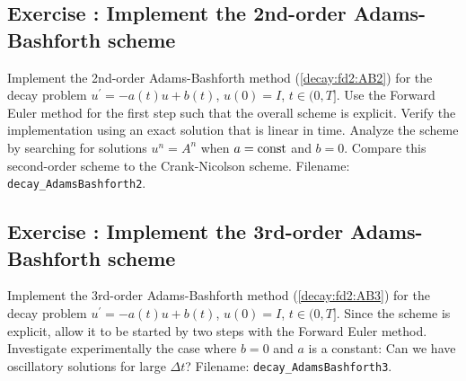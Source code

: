 \documentclass[%
oneside,                 %
final,                   %
10pt]{article}
\newenvironment{doconceexercise}{}{}
\newcounter{doconceexercisecounter}
\begin{document}
\begin{doconceexercise}

\subsection*{Exercise \thedoconceexercisecounter: Implement the 2nd-order Adams-Bashforth scheme}

\label{decay:fd2:exer:AB2}

Implement the 2nd-order Adams-Bashforth method (\ref{decay:fd2:AB2})
for the decay problem $u^{\prime}=-a(t)u + b(t)$, $u(0)=I$, $t\in (0, T]$.
Use the Forward Euler method for the first step such that the overall
scheme is explicit. Verify the implementation using an exact
solution that is linear in time.
Analyze the scheme by searching for solutions $u^n=A^n$ when $a=\hbox{const}$
and $b=0$. Compare this second-order scheme to the Crank-Nicolson scheme.
\noindent Filename: \Verb!decay_AdamsBashforth2!.

\end{doconceexercise}




\begin{doconceexercise}

\subsection*{Exercise \thedoconceexercisecounter: Implement the 3rd-order Adams-Bashforth scheme}

\label{decay:fd2:exer:AB3}

Implement the 3rd-order Adams-Bashforth method (\ref{decay:fd2:AB3})
for the decay problem $u^{\prime}=-a(t)u + b(t)$, $u(0)=I$, $t\in (0, T]$.
Since the scheme is explicit, allow it to be started by two steps with
the Forward Euler method.  Investigate experimentally the case where
$b=0$ and $a$ is a constant: Can we have oscillatory solutions for
large $\Delta t$?
\noindent Filename: \Verb!decay_AdamsBashforth3!.

\end{doconceexercise}
\end{document}
